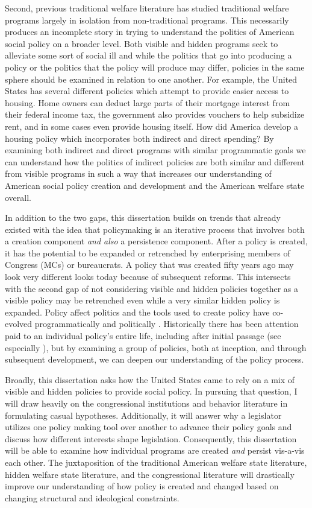 \documentclass[12pt]{article}
\begin{document}
Second, previous traditional welfare literature has studied traditional welfare programs largely in isolation from non-traditional programs. This necessarily produces an incomplete story in trying to understand the politics of American social policy on a broader level. Both visible and hidden programs seek to alleviate some sort of social ill and while the politics that go into producing a policy or the politics that the policy will produce may differ, policies in the same sphere should be examined in relation to one another. For example, the United States has several different policies which attempt to provide easier access to housing. Home owners can deduct large parts of their mortgage interest from their federal income tax, the government also provides vouchers to help subsidize rent, and in some cases even provide housing itself. How did America develop a housing policy which incorporates both indirect and direct spending? By examining both indirect and direct programs with similar programmatic goals we can understand how the politics of indirect policies are both similar and different from visible programs in such a way that increases our understanding of American social policy creation and development and the American welfare state overall.

In addition to the two gaps, this dissertation builds on trends that already existed with the idea that policymaking is an iterative process that involves both a creation component \emph{and also} a persistence component. After a policy is created, it has the potential to be expanded or retrenched by enterprising members of Congress (MCs) or bureaucrats. A policy that was created fifty years ago may look very different looks today because of subsequent reforms. This intersects with the second gap of not considering visible and hidden policies together as a visible policy may be retrenched even while a very similar hidden policy is expanded. Policy affect politics and the tools used to create policy have co-evolved programmatically and politically \citep{schattschneider1960, skocpol1995}.  Historically there has been attention paid to an individual policy's entire life, including after initial passage (see especially \citealt{derthick1979, hacker2002}), but by examining a group of policies, both at inception, and through subsequent development, we can deepen our understanding of the policy process.

Broadly, this dissertation asks how the United States came to rely on a mix of visible and hidden policies to provide social policy. In pursuing that question, I will draw heavily on the congressional institutions and behavior literature in formulating casual hypotheses. Additionally, it will answer why a legislator utilizes one policy making tool over another to advance their policy goals and discuss how different interests shape legislation. Consequently, this dissertation will be able to examine how individual programs are created \emph{and} persist vis-a-vis each other. The juxtaposition of the traditional American welfare state literature, hidden welfare state literature, and the congressional literature will drastically improve our understanding of how policy is created and changed  based on changing structural and ideological constraints.
\end{document}
